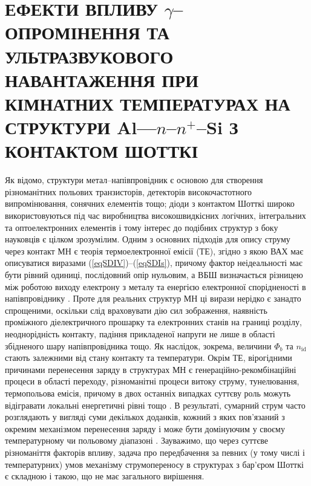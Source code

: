 \chapter{\MakeUppercase{Ефекти впливу} $\gamma$--\MakeUppercase{опромінення та ультразвукового навантаження при кімнатних температурах
на структури} Al---$n$--$n^+$--Si \MakeUppercase{з контактом Шотткі}\label{Ch_GammaSD}}

Як відомо, структури метал--напівпровідник є основою для створення різноманітних польових транзисторів, детекторів високочастотного
випромінювання, сонячних елементів тощо;
діоди з контактом Шотткі широко використовуються під час виробництва високошвидкісних логічних, інтегральних та оптоелектронних елементів
і тому інтерес до подібних структур з боку науковців є цілком зрозумілим.
Одним з основних підходів для опису струму через контакт МН є теорія термоелектронної емісії (ТЕ),
згідно з якою \cite{Colinge,Sze2012,Rhoderick1988,StrihaBook} ВАХ має описуватися виразами (\ref{eqSDIV})--(\ref{eqSDIs}),
причому фактор неідеальності має бути рівний одиниці, послідовний опір нульовим,
а ВБШ визначається різницею між роботою виходу електрону з металу та енергією електронної спорідненості в напівпровіднику \cite{Colinge}.
Проте для реальних структур МН ці вирази нерідко є занадто спрощеними, оскільки
слід враховувати дію сил зображення, наявність проміжного діелектричного прошарку та електронних станів на границі розділу,
неоднорідність контакту, падіння прикладеної напруги не лише в області збідненого шару напівпровідника тощо.
Як наслідок, зокрема, величини $\Phi_b$ та $n_\mathrm{id}$ стають залежними від стану контакту та температури.
Окрім ТЕ, вірогідними причинами перенесення заряду в структурах МН є генераційно-рекомбінаційні процеси в області переходу,
різноманітні процеси витоку струму, тунелювання, термопольова емісія,
причому в двох останніх випадках суттєву роль можуть відігравати локальні енергетичні рівні тощо \cite{Rhoderick1988,Arslan,Donoval2010,Huang,Evstropov,VRH:Lee,Sathaiya}.
В результаті, сумарний струм часто розглядають у вигляді суми декількох доданків,
кожний з яких пов'язаний з окремим механізмом перенесення заряду і може бути домінуючим у своєму температурному чи польовому діапазоні \cite{Arslan,Donoval2010,Huang,GELCZUK2014}.
Зауважимо, що через суттєве різноманіття факторів впливу, задача про передбачення за певних
(у тому числі і температурних) умов механізму струмопереносу в структурах з бар'єром Шотткі є складною і такою, що не має загального вирішення.

